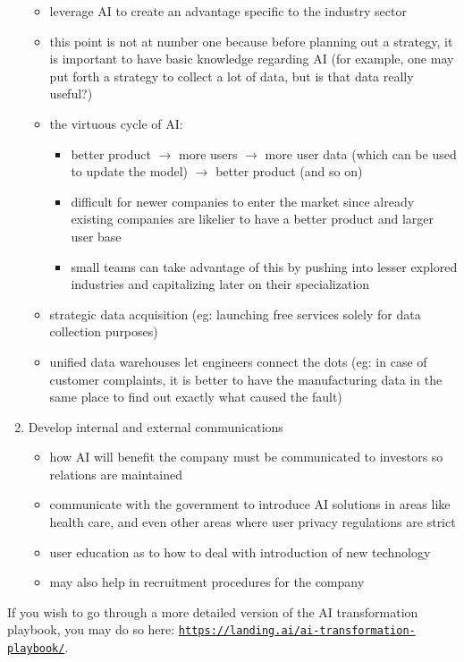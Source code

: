 \documentclass{article}[a4paper,12pt]
\theoremstyle{definition}
\begin{document}
\begin{enumerate}
\begin{itemize}
		\item leverage AI to create an advantage specific to the industry sector
		\item this point is not at number one because before planning out a strategy, it is important to have basic knowledge regarding AI (for example, one may put forth a strategy to collect a lot of data, but is that data really useful?)
		\item the virtuous cycle of AI:
		\begin{itemize}
			\item better product $\rightarrow$ more users $\rightarrow$ more user data (which can be used to update the model) $\rightarrow$ better product (and so on)
			\item difficult for newer companies to enter the market since already existing companies are likelier to have a better product and larger user base
			\item small teams can take advantage of this by pushing into lesser explored industries and capitalizing later on their specialization
		\end{itemize}
		\item strategic data acquisition (eg: launching free services solely for data collection purposes)
		\item unified data warehouses let engineers connect the dots (eg: in case of customer complaints, it is better to have the manufacturing data in the same place to find out exactly what caused the fault)
	\end{itemize}
	\item Develop internal and external communications
	\begin{itemize}
		\item how AI will benefit the company must be communicated to investors so relations are maintained
		\item communicate with the government to introduce AI solutions in areas like health care, and even other areas where user privacy regulations are strict
		\item user education as to how to deal with introduction of new technology
		\item may also help in recruitment procedures for the company
	\end{itemize}
\end{enumerate}
If you wish to go through a more detailed version of the AI transformation playbook, you may do so here: \texttt{\href{https://landing.ai/ai-transformation-playbook/}{https://landing.ai/ai-transformation-playbook/}}.
\end{document}
